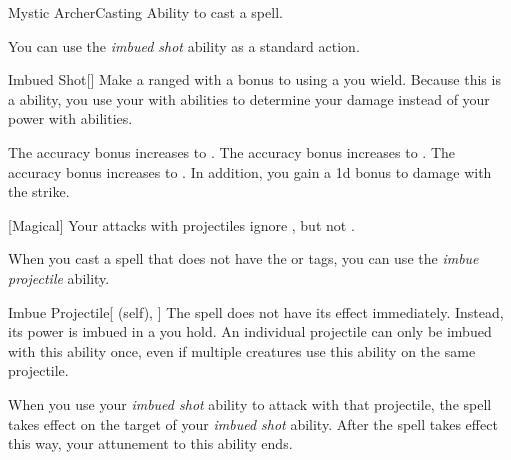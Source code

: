     \begin{feat}{Mystic Archer}{Casting}
        \featpre Ability to cast a spell.

         You can use the \textit{imbued shot} ability as a standard action.
        \begin{freeability}{Imbued Shot}[]
            Make a ranged  with a  bonus to  using a  you wield.
            Because this is a  ability, you use your  with  abilities to determine your damage instead of your power with  abilities.

            \rankline
             The accuracy bonus increases to .
             The accuracy bonus increases to .
             The accuracy bonus increases to .
                In addition, you gain a \plus1d bonus to damage with the strike.
        \end{freeability}

        [Magical] Your attacks with projectiles ignore , but not .

         When you cast a spell that does not have the  or  tags,
            you can use the \textit{imbue projectile} ability.
        \begin{attuneability}{Imbue Projectile}[ (self), ]
            The spell does not have its effect immediately.
            Instead, its power is imbued in a  you hold.
            An individual projectile can only be imbued with this ability once, even if multiple creatures use this ability on the same projectile.

            When you use your \textit{imbued shot} ability to attack with that projectile, the spell takes effect on the target of your \textit{imbued shot} ability.
            After the spell takes effect this way, your attunement to this ability ends.
        \end{attuneability}



\end{feat}
